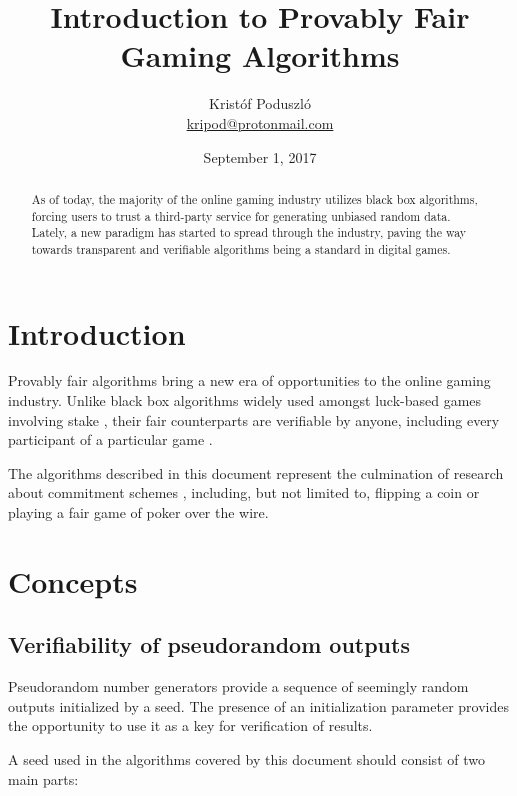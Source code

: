 \documentclass[a4paper]{article}
\theoremstyle{definition}
\theoremstyle{remark}
\begin{document}
\title{Introduction to Provably Fair Gaming Algorithms}
\author{Kristóf Poduszló \\ \href{mailto:kripod@protonmail.com}{kripod@protonmail.com}}
\date{September 1, 2017}
\maketitle

\begin{abstract}
As of today, the majority of the online gaming industry utilizes black box algorithms, forcing users to trust a third-party service for generating unbiased random data. Lately, a new paradigm has started to spread through the industry, paving the way towards transparent and verifiable algorithms being a standard in digital games.
\end{abstract}

\section{Introduction}
Provably fair algorithms bring a new era of opportunities to the online gaming industry. Unlike black box algorithms widely used amongst luck-based games involving stake \cite{gainsbury2013, riggedcasinos}, their fair counterparts are verifiable by anyone, including every participant of a particular game \cite{buterin2013}.

The algorithms described in this document represent the culmination of research about commitment schemes \cite{brassard1988, naor1991}, including, but not limited to, flipping a coin \cite{blum1983} \cite[pp.~243--245]{kraft2013} or playing a fair game of poker \cite{shamir1981, castellaroca2005} over the wire.

\section{Concepts}
\subsection{Verifiability of pseudorandom outputs}
Pseudorandom number generators provide a sequence of seemingly random outputs initialized by a seed. The presence of an initialization parameter provides the opportunity to use it as a key for verification of results.

A seed used in the algorithms covered by this document should consist of two main parts:
\end{document}
